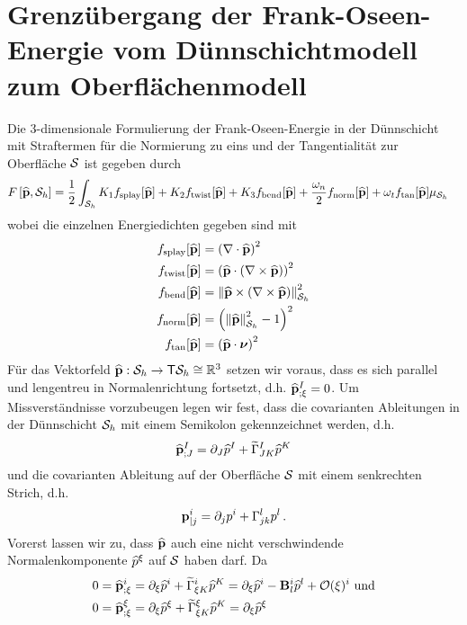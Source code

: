 \documentclass[a4paper,11pt]{scrartcl}
\newcommand{\surfh}{\surf_{h}}
\newcommand{\landau}{\mathcal{O}}
\newcommand{\tildeCh}[3]{\widetilde{\Gamma}_{#1 #2}^{#3}} %
\newcommand{\Ch}[3]{\Gamma_{#1 #2}^{#3}} %
\begin{document}
\section{Grenzübergang der Frank-Oseen-Energie vom Dünnschichtmodell zum Oberflächenmodell}
Die 3-dimensionale Formulierung der Frank-Oseen-Energie in der Dünnschicht 
mit Straftermen für die Normierung zu eins und der Tangentialität zur Oberfläche \( \mathcal{S} \) 
ist gegeben durch
\begin{align}
    F\left[ \pExt, \surfh \right] 
        &= \frac{1}{2}\int_{\surfh} \Ki f_{\text{splay}}[\pExt] + \Kii f_{\text{twist}}[\pExt] +  \Kiii f_{\text{bend}}[\pExt]
                                    +\frac{\Kn}{2}f_{\text{norm}}[\pExt] + \Kt f_{\text{tan}}[\pExt]\mu_{\surfh}
\end{align}
wobei die einzelnen Energiedichten gegeben sind mit
\begin{align}
  f_{\text{splay}}[\pExt] &= \left( \nabla\cdot\pExt \right)^{2} \\
  f_{\text{twist}}[\pExt] &= \left( \pExt\cdot\left( \nabla\times\pExt \right) \right)^{2} \\
  f_{\text{bend}}[\pExt] &= \left\| \pExt\times\left( \nabla\times\pExt \right) \right\|^{2}_{\surfh} \\
  f_{\text{norm}}[\pExt] &= \left( \left\| \pExt \right\|^{2}_{\surfh} - 1 \right)^{2} \\
  f_{\text{tan}}[\pExt] &= \left( \pExt \cdot \surfNormal \right)^{2}
\end{align}
Für das Vektorfeld \( \pExt:\surfh \rightarrow \Tangent\surfh \cong \R^{3} \) setzen wir voraus, 
dass es sich parallel und lengentreu in Normalenrichtung fortsetzt,
d.h. \( \mathbf{\widehat{p}}{^{I}_{;\xi}} = 0 \).
Um Missverständnisse vorzubeugen legen wir fest, dass die covarianten Ableitungen in der Dünnschicht \( \surfh \) mit einem Semikolon gekennzeichnet
werden, d.h.
\begin{align}
  \tensor{\pIExt}{^{I}_{;J}} = \partial_{J}\pIExt^{I} + \tildeCh{J}{K}{I}\pIExt^{K} 
\end{align}
und die covarianten Ableitung auf der Oberfläche \( \mathcal{S} \) mit einem senkrechten Strich, d.h.
\begin{align}
  \tensor{p}{^{i}_{|j}} = \partial_{j}p^{i} + \Ch{j}{k}{l}p^{l} \formPeriod
\end{align}
Vorerst lassen wir zu, dass \( \widehat{\mathbf{p}} \) auch eine nicht verschwindende Normalenkomponente \( \widehat{p}^{\xi} \) auf \( \mathcal{S} \) haben darf.
Da
\begin{align}
  0 &= \tensor{\pIExt}{^{i}_{;\xi}} = \partial_{\xi}\pIExt^{i} + \tildeCh{\xi}{K}{i}\pIExt^{K} 
                                    = \partial_{\xi}\pIExt^{i} - \tensor{B}{_{l}^{i}}\pIExt^{l} + \landau(\xi)^{i}
  \text{ und} \\
  0 &= \tensor{\pIExt}{^{\xi}_{;\xi}} = \partial_{\xi}\pIExt^{\xi} + \tildeCh{\xi}{K}{\xi}\pIExt^{K}
                                      = \partial_{\xi}\pIExt^{\xi}
\end{align}
\end{document}
